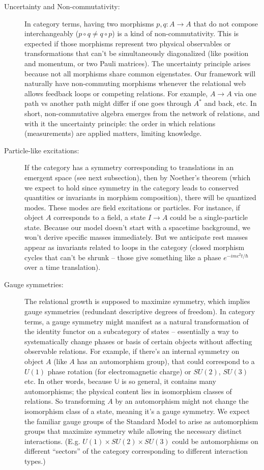 \documentclass{article}
\begin{document}
\begin{description}
\item[Uncertainty and Non-commutativity:] In category terms, having two morphisms $p, q: A \to A$ that do not compose interchangeably ($p\circ q \neq q\circ p$) is a kind of non-commutativity. This is expected if those morphisms represent two physical observables or transformations that can’t be simultaneously diagonalized (like position and momentum, or two Pauli matrices). The uncertainty principle arises because not all morphisms share common eigenstates. Our framework will naturally have non-commuting morphisms whenever the relational web allows feedback loops or competing relations. For example, $A \to A$ via one path vs another path might differ if one goes through $A^*$ and back, etc. In short, non-commutative algebra emerges from the network of relations, and with it the uncertainty principle: the order in which relations (measurements) are applied matters, limiting knowledge.

\item[Particle-like excitations:] If the category has a symmetry corresponding to translations in an emergent space (see next subsection), then by Noether’s theorem (which we expect to hold since symmetry in the category leads to conserved quantities or invariants in morphism composition), there will be quantized modes. These modes are field excitations or particles. For instance, if object $A$ corresponds to a field, a state $I \to A$ could be a single-particle state. Because our model doesn’t start with a spacetime background, we won’t derive specific masses immediately. But we anticipate rest masses appear as invariants related to loops in the category (closed morphism cycles that can’t be shrunk – those give something like a phase $e^{-i mc^2 t/\hbar}$ over a time translation).

\item[Gauge symmetries:] The relational growth is supposed to maximize symmetry, which implies gauge symmetries (redundant descriptive degrees of freedom). In category terms, a gauge symmetry might manifest as a natural transformation of the identity functor on a subcategory of states – essentially a way to systematically change phases or basis of certain objects without affecting observable relations. For example, if there’s an internal symmetry on object $A$ (like $A$ has an automorphism group), that could correspond to a $U(1)$ phase rotation (for electromagnetic charge) or $SU(2)$, $SU(3)$ etc. In other words, because $\mathbb{U}$ is so general, it contains many automorphisms; the physical content lies in isomorphism classes of relations. So transforming $A$ by an automorphism might not change the isomorphism class of a state, meaning it’s a gauge symmetry. We expect the familiar gauge groups of the Standard Model to arise as automorphism groups that maximize symmetry while allowing the necessary distinct interactions. (E.g. $U(1)\times SU(2)\times SU(3)$ could be automorphisms on different “sectors” of the category corresponding to different interaction types.)
\end{description}
\end{document}
